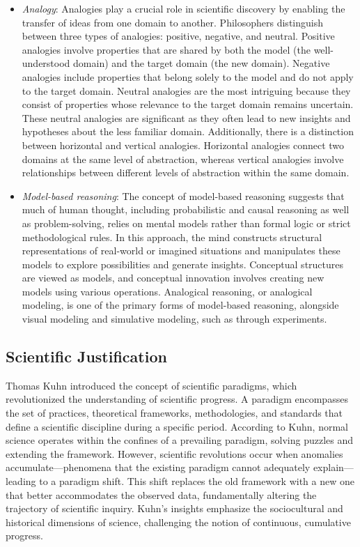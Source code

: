 \begin{itemize}

\item \emph{Analogy}: Analogies play a crucial role in scientific discovery by enabling the transfer of ideas from one domain to another. Philosophers distinguish between three types of analogies: positive, negative, and neutral. Positive analogies involve properties that are shared by both the model (the well-understood domain) and the target domain (the new domain). Negative analogies include properties that belong solely to the model and do not apply to the target domain. Neutral analogies are the most intriguing because they consist of properties whose relevance to the target domain remains uncertain. These neutral analogies are significant as they often lead to new insights and hypotheses about the less familiar domain. Additionally, there is a distinction between horizontal and vertical analogies. Horizontal analogies connect two domains at the same level of abstraction, whereas vertical analogies involve relationships between different levels of abstraction within the same domain.

\item \emph{Model-based reasoning}: The concept of model-based reasoning suggests that much of human thought, including probabilistic and causal reasoning as well as problem-solving, relies on mental models rather than formal logic or strict methodological rules. In this approach, the mind constructs structural representations of real-world or imagined situations and manipulates these models to explore possibilities and generate insights. Conceptual structures are viewed as models, and conceptual innovation involves creating new models using various operations. Analogical reasoning, or analogical modeling, is one of the primary forms of model-based reasoning, alongside visual modeling and simulative modeling, such as through experiments.

\end{itemize}

\subsection{Scientific Justification}

Thomas Kuhn introduced the concept of scientific paradigms, which revolutionized the understanding of scientific progress. A paradigm encompasses the set of practices, theoretical frameworks, methodologies, and standards that define a scientific discipline during a specific period. According to Kuhn, normal science operates within the confines of a prevailing paradigm, solving puzzles and extending the framework. However, scientific revolutions occur when anomalies accumulate—phenomena that the existing paradigm cannot adequately explain—leading to a paradigm shift. This shift replaces the old framework with a new one that better accommodates the observed data, fundamentally altering the trajectory of scientific inquiry. Kuhn's insights emphasize the sociocultural and historical dimensions of science, challenging the notion of continuous, cumulative progress.

